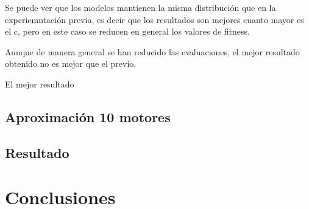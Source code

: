 \documentclass[12pt, spanish, pdftex]{UC3M_document}
\begin{document}
Se puede ver que los modelos mantienen la misma distribución que en la experiemntación previa, es decir que los resultados son mejores cuanto mayor es el c, pero en este caso se reducen en general los valores de fitness.

Aunque de manera general se han reducido las evaluaciones, el mejor resultado obtenido no es mejor que el previo.

El mejor resultado


\subsection{Aproximación 10 motores}


\subsection{Resultado}


\section{Conclusiones}
\end{document}
